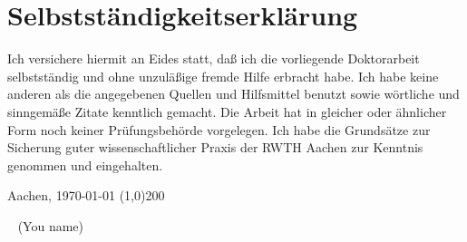 \chapter*{Selbstst\"andigkeitserkl\"arung}

\graphicspath{{preamble/figs}}

Ich versichere hiermit an Eides statt, da{\ss} ich die vorliegende Doktorarbeit selbstst\"andig und ohne unzul\"a{\ss}ige fremde Hilfe erbracht habe. Ich habe keine anderen als die angegebenen Quellen und \mbox{Hilfsmittel} benutzt sowie w\"ortliche und sinngem\"a{\ss}e Zitate kenntlich gemacht. Die Arbeit hat in \mbox{gleicher} oder \"ahnlicher Form noch keiner Pr\"ufungsbeh\"orde vorgelegen. Ich habe die Grunds\"atze zur Sicherung guter wissenschaftlicher Praxis der RWTH Aachen zur Kenntnis genommen und \linebreak eingehalten.

\vspace{2cm}


\hfill Aachen, \today \hspace{0.1cm} \line(1,0){200}

\ \hspace{9.3cm} (You name)


